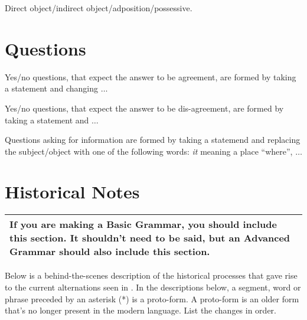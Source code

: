 Direct object/indirect object/adposition/possessive.

\section{Questions}

Yes/no questions, that expect the answer to be agreement, are formed by taking a statement and changing $\ldots$

Yes/no questions, that expect the answer to be dis-agreement, are formed by taking a statement and $\ldots$

Questions asking for information are formed by taking a statemend and replacing the subject/object with one of the following words:
\textit{it} meaning a place ``where'',
$\ldots$

\section{Historical Notes}

\begin{center}
\begin{tabular}{|p{}|}
\hline
If you are making a Basic Grammar, you should include this section.
It shouldn't need to be said, but an Advanced Grammar should also include this section.
\\\hline
\end{tabular}
\end{center}

Below is a behind-the-scenes description of the historical processes that gave rise to the current alternations seen in \LanguageName.
In the descriptions below, a segment, word or phrase preceded by an asterisk (*) is a proto-form.
A proto-form is an older form that's no longer present in the modern language.
List the changes in order.

